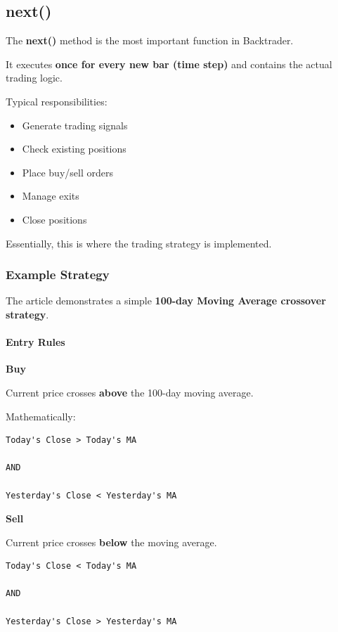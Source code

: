 \documentclass[12pt,openany]{book}
\begin{document}
\subsection{next()}

The \textbf{next()} method is the most important function in Backtrader.

It executes \textbf{once for every new bar (time step)} and contains the actual trading logic.

Typical responsibilities:

\begin{itemize}[leftmargin=*]
    \item Generate trading signals
    \item Check existing positions
    \item Place buy/sell orders
    \item Manage exits
    \item Close positions
\end{itemize}

Essentially, this is where the trading strategy is implemented.

\subsubsection{Example Strategy}

The article demonstrates a simple \textbf{100-day Moving Average crossover strategy}.

\paragraph{Entry Rules}

\textbf{Buy}

Current price crosses \textbf{above} the 100-day moving average.

Mathematically:

\begin{Verbatim}[breaklines=true,breakanywhere=true,fontsize=\small]
Today's Close > Today's MA

AND

Yesterday's Close < Yesterday's MA
\end{Verbatim}

\textbf{Sell}

Current price crosses \textbf{below} the moving average.

\begin{Verbatim}[breaklines=true,breakanywhere=true,fontsize=\small]
Today's Close < Today's MA

AND

Yesterday's Close > Yesterday's MA
\end{Verbatim}
\end{document}
